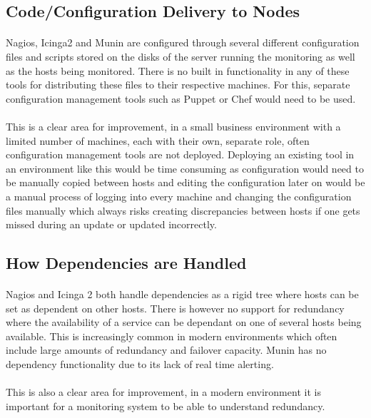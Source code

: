 \documentclass[bsc,logo,twoside,singlespacing]{infthesis}
\begin{document}
\subsection{Code/Configuration Delivery to Nodes}
\paragraph*{}
	Nagios, Icinga2 and Munin are configured through several different
	configuration files and scripts stored on the disks of the server running the
	monitoring as well as the hosts being monitored.  There is no built in
	functionality in any of these tools for distributing these files to their
	respective machines.  For this, separate configuration management tools such as
	Puppet or Chef would need to be used.
	
\paragraph*{}
	This is a clear area for improvement, in a small business environment with a
	limited number of machines, each with their own, separate role, often
	configuration management tools are not deployed.  Deploying an existing tool
	in an environment like this would be time consuming as configuration would need
	to be manually copied between hosts and editing the configuration later on
	would be a manual process of logging into every machine and changing the
	configuration files manually which always risks creating discrepancies between
	hosts if one gets missed during an update or updated incorrectly.

\subsection{How Dependencies are Handled}
\paragraph*{}
	Nagios and Icinga 2 both handle dependencies as a rigid tree where hosts can
	be set as dependent on other hosts.  There is however no support for redundancy
	where the availability of a service can be dependant on one of several hosts
	being available. This is increasingly common in modern environments which often
	include large amounts of redundancy and failover capacity. Munin has no
	dependency functionality due to its lack of real time alerting.
	
\paragraph*{}
	This is also a clear area for improvement, in a modern environment it is
	important for a monitoring system to be able to understand redundancy.
\end{document}
